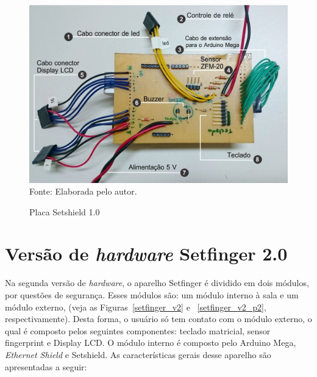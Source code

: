 \begin{figure}[!t]
  \begin{center}
  \caption{Placa Setshield 1.0}
  \includegraphics[scale=0.5]{figuras/cap4/setshield_v1.jpg}\\
  Fonte: Elaborada pelo autor.
  \label{setshield_v1}
  \end{center}
  \end{figure}




\chapter{Versão de \textit{hardware} Setfinger 2.0\label{hardware_2.0}}


Na segunda versão de \textit{hardware}, o aparelho Setfinger é dividido em dois módulos, por questões de segurança. Esses módulos são: um módulo interno à sala e um módulo externo,  (veja as Figuras~\ref{setfinger_v2} e ~\ref{setfinger_v2_p2}, respectivamente). Desta forma, o usuário só tem contato com o módulo externo, o qual é composto pelos seguintes componentes: teclado matricial, sensor fingerprint e Display LCD.  O módulo interno é composto pelo Arduino Mega, \textit{Ethernet Shield} e Setshield. As características gerais desse aparelho são apresentadas a seguir:


